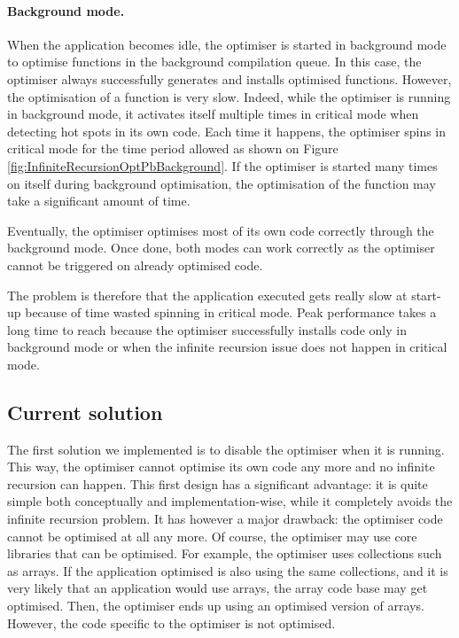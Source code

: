 \documentclass[a4paper,12pt,twoside]{../includes/ThesisStyle}
\begin{document}
\paragraph{Background mode.} When the application becomes idle, the optimiser is started in background mode to optimise functions in the background compilation queue. In this case, the optimiser always successfully generates and installs optimised functions. However, the optimisation of a function is very slow. Indeed, while the optimiser is running in background mode, it activates itself multiple times in critical mode when detecting hot spots in its own code. Each time it happens, the optimiser spins in critical mode for the time period allowed as shown on Figure \ref{fig:InfiniteRecursionOptPbBackground}. If the optimiser is started many times on itself during background optimisation, the optimisation of the function may take a significant amount of time. 

Eventually, the optimiser optimises most of its own code correctly through the background mode. Once done, both modes can work correctly as the optimiser cannot be triggered on already optimised code.

The problem is therefore that the application executed gets really slow at start-up because of time wasted spinning in critical mode. Peak performance takes a long time to reach because the optimiser successfully installs code only in background mode or when the infinite recursion issue does not happen in critical mode. 

\subsection{Current solution}

The first solution we implemented is to disable the optimiser when it is running. This way, the optimiser cannot optimise its own code any more and no infinite recursion can happen. This first design has a significant advantage: it is quite simple both conceptually and implementation-wise, while it completely avoids the infinite recursion problem. It has however a major drawback: the optimiser code cannot be optimised at all any more. Of course, the optimiser may use core libraries that can be optimised. For example, the optimiser uses collections such as arrays. If the application optimised is also using the same collections, and it is very likely that an application would use arrays, the array code base may get optimised. Then, the optimiser ends up using an optimised version of arrays. However, the code specific to the optimiser is not optimised.
\end{document}
